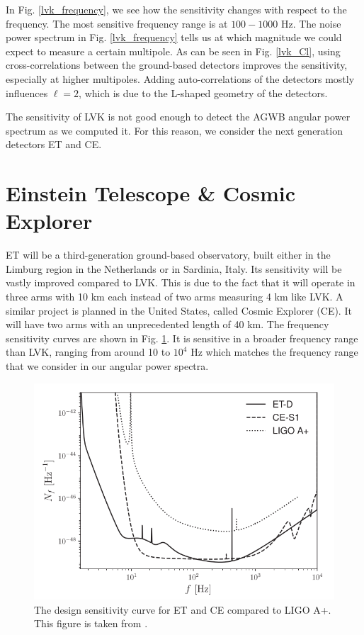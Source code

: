 In Fig. \ref{lvk_frequency}, we see how the sensitivity changes with respect to the frequency. The most sensitive frequency range is at $100 -1000$ Hz.
The noise power spectrum in Fig. \ref{lvk_frequency} tells us at which magnitude we could expect to measure a certain multipole.
As can be seen in Fig. \ref{lvk_Cl}, using cross-correlations between the ground-based detectors improves the sensitivity, especially at higher multipoles. Adding auto-correlations of the detectors mostly influences $\ell=2$, which is due to the L-shaped geometry of the detectors. 

The sensitivity of LVK is not good enough to detect the AGWB angular power spectrum as we computed it. For this reason, we consider the next generation detectors ET and CE.

\section{Einstein Telescope \& Cosmic Explorer}

\label{ET_CE}

ET will be a third-generation ground-based observatory, built either in the Limburg region in the Netherlands or in Sardinia, Italy. Its sensitivity will be vastly improved compared to LVK. This is due to the fact that it will operate in three arms with 10 km each instead of two arms measuring 4 km like LVK. A similar project is planned in the United States, called Cosmic Explorer (CE). It will have two arms with an unprecedented length of 40 km. The frequency sensitivity curves are shown in Fig. \ref{ET_sensitivity}. It is sensitive in a broader frequency range than LVK, ranging from around 10 to $10^4$ Hz which matches the frequency range that we consider in our angular power spectra.
\begin{figure}
    \centering
    \includegraphics[width=0.7\linewidth]{Images/ET_CE_frequency_noise.png}
    \caption[The design sensitivity curve for ET and CE compared to LIGO A+.]{The design sensitivity curve for ET and CE compared to LIGO A+. This figure is taken from \cite{alonso_noise_2020}.}
    \label{ET_sensitivity}
\end{figure} 

